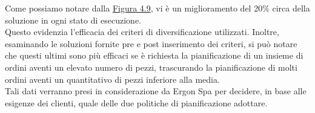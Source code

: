 Come possiamo notare dalla \hyperref[4.9]{Figura 4.9}, vi è un miglioramento del 20\% circa della soluzione in ogni stato di esecuzione.\\
Questo evidenzia l'efficacia dei criteri di diversificazione utilizzati.
Inoltre, esaminando le soluzioni fornite pre e post inserimento dei criteri, si può notare che questi ultimi sono più efficaci se è richiesta la pianificazione di un insieme
di ordini aventi un elevato numero di pezzi, trascurando la pianificazione di molti ordini aventi un quantitativo di pezzi inferiore alla media.\\
Tali dati verranno presi in considerazione da Ergon Spa per decidere, in base alle esigenze dei clienti, quale delle due politiche di pianificazione adottare.
